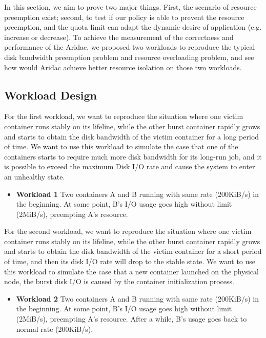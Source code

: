\documentclass[10pt, conference,compsoc]{IEEEtran}
\begin{document}
In this section, we aim to prove two major things. First, the scenario of resource preemption exist; second, to test if our policy is able to prevent the resource preemption, and the quota limit can adapt the dynamic desire of application (e.g. increase or decrease). To achieve the measurement of the correctness and performance of the Aridac, we proposed two workloads to reproduce the typical disk bandwidth preemption problem and resource overloading problem, and see how would Aridac achieve better resource isolation on those two workloads.

\subsection{Workload Design}
For the first workload, we want to reproduce the situation where one victim container runs stably on its lifeline, while the other burst container rapidly grows and starts to obtain the disk bandwidth of the victim container for a long period of time. We want to use this workload to simulate the case that one of the containers starts to require much more disk bandwidth for its long-run job, and it is possible to exceed the maximum Disk I/O rate and cause the system to enter an unhealthy state.

\begin{itemize}
  \item \textbf{Workload 1} Two containers A and B running with same rate (200KiB/s) in the beginning. At some point, B's I/O usage goes high without limit (2MiB/s), preempting A's resource.
\end{itemize}

For the second workload, we want to reproduce the situation where one victim container runs stably on its lifeline, while the other burst container rapidly grows and starts to obtain the disk bandwidth of the victim container for a short period of time, and then its disk I/O rate will drop to the stable state. We want to use this workload to simulate the case that a new container launched on the physical node, the burst disk I/O is caused by the container initialization process.

\begin{itemize}
  \item \textbf{Workload 2} Two containers A and B running with same rate (200KiB/s) in the beginning. At some point, B's I/O usage goes high without limit (2MiB/s), preempting A's resource. After a while, B's usage goes back to normal rate (200KiB/s).
\end{itemize}
\end{document}
